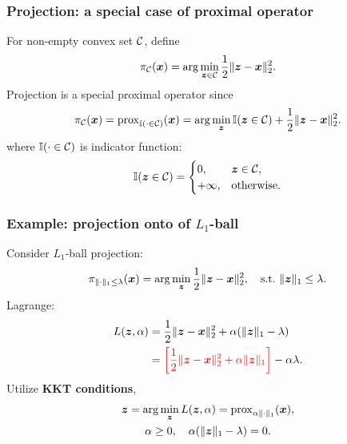 \documentclass{beamer}
\begin{document}
\begin{frame}[fragile]
    \frametitle{Projection: a special case of proximal operator}
    For non-empty convex set ${\mathcal C}$, define
    \begin{equation}
        \pi_{{\mathcal C}}({\bm x})=\arg\min_{{\bm z}\in{\mathcal C}}\frac12\|{\bm z}-{\bm x}\|_2^2.
    \end{equation}
    Projection is a special proximal operator since
    \begin{equation}
        \pi_{{\mathcal C}}({\bm x})=\mathrm{prox}_{{\mathbb I}(\cdot\in{\mathcal C})}({\bm x})=\arg\min_{{\bm z}}{\mathbb I}({\bm z}\in{\mathcal C})+\frac12\|{\bm z}-{\bm x}\|_2^2.
    \end{equation}
    where ${\mathbb I}(\cdot\in{\mathcal C})$ is indicator function:
    \begin{equation}
        {\mathbb I}({\bm z}\in{\mathcal C})=\begin{cases}
            0,      &{\bm z}\in{\mathcal C},\\
            +\infty,&\mathrm{otherwise}.
        \end{cases}
    \end{equation}
\end{frame}

\begin{frame}[fragile]
    \frametitle{Example: projection onto of $L_1$-ball}
    Consider $L_1$-ball projection:
    \begin{equation}
        \pi_{\|\cdot\|_1\leq\lambda}({\bm x})=\arg\min_{{\bm z}}\frac12\|{\bm z}-{\bm x}\|_2^2,\quad\mathrm{s.t.}~ \|{\bm z}\|_1\leq\lambda.
    \end{equation}
    Lagrange:
    \begin{align}
        L({\bm z},\alpha)
        &=\frac12\|{\bm z}-{\bm x}\|_2^2+\alpha(\|{\bm z}\|_1-\lambda)\\
        &={\color{red}\left[\frac12\|{\bm z}-{\bm x}\|_2^2+\alpha\|{\bm z}\|_1\right]}-\alpha\lambda.
    \end{align}
    Utilize \textbf{KKT conditions},
    \begin{gather}
        {\bm z}=\arg\min_{{\bm z}}L({\bm z},\alpha)=\mathrm{prox}_{\alpha\|\cdot\|_1}({\bm x}),\\
        \alpha\geq 0,\quad\alpha(\|{\bm z}\|_1-\lambda)=0.
    \end{gather}
    \vspace{15pt}
\end{frame}
\end{document}
